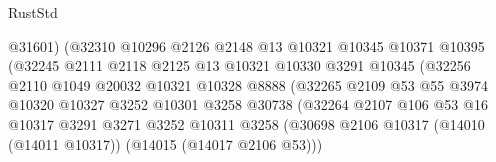 \begin{lexlean}{RustStd}
\begin{coremodule}
                                      @31601)
                                    (@32310
                                      @10296
                                      @2126
                                      @2148
                                      @13
                                      @10321
                                      @10345
                                      @10371
                                      @10395
                                      (@32245
                                        @2111
                                        @2118
                                        @2125
                                        @13
                                        @10321
                                        @10330
                                        @3291
                                        @10345
                                        (@32256
                                          @2110
                                          @1049
                                          @20032
                                          @10321
                                          @10328
                                          @8888
                                          (@32265
                                            @2109
                                            @53
                                            @55
                                            @3974
                                            @10320
                                            @10327
                                            @3252
                                            @10301
                                            @3258
                                            @30738
                                            (@32264
                                              @2107
                                              @106
                                              @53
                                              @16
                                              @10317
                                              @3291
                                              @3271
                                              @3252
                                              @10311
                                              @3258
                                              (@30698
                                                @2106
                                                @10317
                                                (@14010 (@14011 @10317))
                                                (@14015 (@14017 @2106 @53)))

\end{coremodule}
\end{lexlean}
